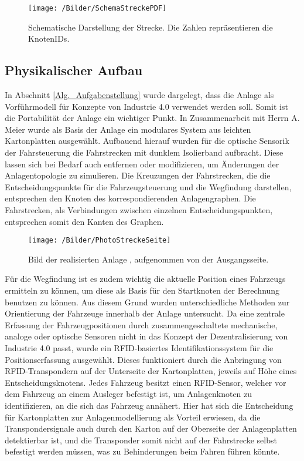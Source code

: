 			\begin{figure}[h]
				\texttt{[image: /Bilder/SchemaStreckePDF]}\\
				\caption{Schematische Darstellung der Strecke. Die Zahlen repräsentieren die KnotenIDs.}\label{Schema Strecke}
			\end{figure}
		
		\subsection{Physikalischer Aufbau}
			\label{Phys_Anlage}
			In Abschnitt \ref{Alg._Aufgabenstellung} wurde dargelegt, dass die Anlage als Vorführmodell für Konzepte von Industrie 4.0  verwendet werden soll. Somit ist die Portabilität der Anlage ein wichtiger Punkt. In Zusammenarbeit mit Herrn A. Meier wurde als Basis der Anlage ein modulares System aus leichten Kartonplatten ausgewählt. Aufbauend hierauf wurden für die optische Sensorik der Fahrsteuerung die Fahrstrecken mit dunklem Isolierband aufbracht. Diese lassen sich bei Bedarf auch entfernen oder modifizieren, um Änderungen der Anlagentopologie zu simulieren. Die Kreuzungen der Fahrstrecken, die die Entscheidungspunkte für die Fahrzeugsteuerung und die Wegfindung darstellen, entsprechen den Knoten des korrespondierenden Anlagengraphen. Die Fahrstrecken, als Verbindungen zwischen einzelnen Entscheidungspunkten, entsprechen somit den Kanten des Graphen.
			
			\begin{figure}[h]
				\centering
				\texttt{[image: /Bilder/PhotoStreckeSeite]}\label{Photo Strecke}
				\vspace{0.2cm}
				\caption{Bild der realisierten Anlage \cite{Meier16}, aufgenommen von der Ausgangsseite.}
			\end{figure}
			
			Für die Wegfindung ist es zudem wichtig die aktuelle Position eines Fahrzeugs ermitteln zu können, um diese als Basis für den Startknoten der Berechnung benutzen zu können. Aus diesem Grund wurden unterschiedliche Methoden zur Orientierung der Fahrzeuge innerhalb der Anlage untersucht. Da eine zentrale Erfassung der Fahrzeugpositionen durch zusammengeschaltete mechanische, analoge oder optische Sensoren nicht in das Konzept der Dezentralisierung von Industrie 4.0 passt, wurde ein \ac{RFID}-basiertes Identifikationssystem für die Positionserfassung ausgewählt. Dieses funktioniert durch die Anbringung von \ac{RFID}-Transpondern auf der Unterseite der Kartonplatten, jeweils auf Höhe eines Entscheidungsknotens. Jedes Fahrzeug besitzt einen \ac{RFID}-Sensor, welcher vor dem Fahrzeug an einem Ausleger befestigt ist, um Anlagenknoten zu identifizieren, an die sich das Fahrzeug annähert. Hier hat sich die Entscheidung für Kartonplatten zur Anlagenmodellierung als Vorteil erwiesen, da die Transpondersignale auch durch den Karton auf der Oberseite der Anlagenplatten detektierbar ist, und die Transponder somit nicht auf der Fahrstrecke selbst befestigt werden müssen, was zu Behinderungen beim Fahren führen könnte.
			
